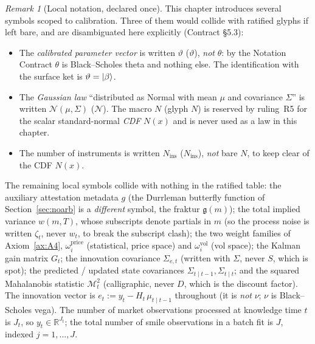 \documentclass[11pt]{book}
\theoremstyle{plain}
\theoremstyle{definition}
\theoremstyle{remark}
\newtheorem{remark}[theorem]{Remark}
\newcommand{\ket}[1]{\mathinner{\lvert #1 \rangle}}
\newcommand{\parket}{\ket{\beta}}                %
\newcommand{\mln}{m}                             %
\newcommand{\ncdf}{N}                            %
\newcommand{\Nrm}{\mathcal{N}}                   %
\newcommand{\parvec}{\vartheta}                  %
\newcommand{\gDurr}{\mathfrak{g}}                %
\newcommand{\Ninstr}{N_{\mathrm{ins}}}           %
\begin{document}
\begin{remark}[Local notation, declared once]
This chapter introduces several symbols scoped to calibration. Three of them
would collide with ratified glyphs if left bare, and are disambiguated here
explicitly (Contract \S5.3):
\begin{itemize}[nosep]
    \item The \emph{calibrated parameter vector} is written $\parvec$
        ($\vartheta$), \emph{not} $\theta$: by the Notation Contract $\theta$ is
        Black--Scholes theta and nothing else. The identification with the
        surface ket is $\parvec=\parket$.
    \item The \emph{Gaussian law} ``distributed as Normal with mean $\mu$ and
        covariance $\Sigma$'' is written $\Nrm(\mu,\Sigma)$ ($\mathcal{N}$). The
        macro $\ncdf$ (glyph $N$) is reserved by ruling~R5 for the scalar
        standard-normal \emph{CDF} $N(x)$ and is never used as a law in this
        chapter.
    \item The number of instruments is written $\Ninstr$ ($N_{\mathrm{ins}}$),
        \emph{not} bare $N$, to keep clear of the CDF $N(x)$.
\end{itemize}
The remaining local symbols collide with nothing in the ratified table: the
auxiliary attestation metadata $g$ (the Durrleman butterfly function of
Section~\ref{sec:noarb} is a \emph{different} symbol, the fraktur $\gDurr(\mln)$);
the total implied variance $w(\mln,T)$, whose subscripts denote partials in
$\mln$ (so the process noise is written $\zeta_t$, never $w_t$, to break the
subscript clash); the two weight families of Axiom~\ref{ax:A4},
$\omega_i^{\text{price}}$ (statistical, price space) and $\omega_i^{\text{vol}}$
(vol space); the Kalman gain matrix $G_t$; the innovation covariance
$\Sigma_{e,t}$ (written with $\Sigma$, never $S$, which is spot); the predicted /
updated state covariances $\Sigma_{t\mid t-1},\Sigma_{t\mid t}$; and the squared
Mahalanobis statistic $\mathcal{M}_t^2$ (calligraphic, never $D$, which is the
discount factor). The innovation vector is $e_t := y_t - H_t\,\mu_{t\mid t-1}$
throughout (it is \emph{not} $\nu$; $\nu$ is Black--Scholes vega). The number of
market observations processed at knowledge time $t$ is $J_t$, so
$y_t\in\mathbb{R}^{J_t}$; the total number of smile observations in a batch fit is
$J$, indexed $j=1,\dots,J$.
\end{remark}
\end{document}

